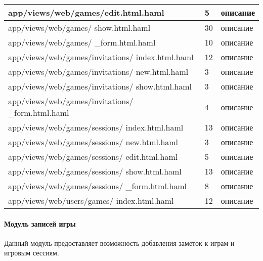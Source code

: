\begin{longtable}[h]{| p{} | p{} | p{} |}
  \hline
  app/views/web/games/edit.html.haml   &   5  &  описание \\
  \hline
  app/views/web/games/ show.html.haml   &   30  &  описание \\
  \hline
  app/views/web/games/ \_form.html.haml   &   10  &  описание \\
  \hline
  app/views/web/games/invitations/ index.html.haml   &   12  &  описание \\
  \hline
  app/views/web/games/invitations/ new.html.haml   &   3  &  описание \\
  \hline
  app/views/web/games/invitations/ show.html.haml   &   3  &  описание \\
  \hline
  app/views/web/games/invitations/ \_form.html.haml   &   4  &  описание \\
  \hline
  app/views/web/games/sessions/ index.html.haml   &   13  &  описание \\
  \hline
  app/views/web/games/sessions/ new.html.haml   &   3  &  описание \\
  \hline
  app/views/web/games/sessions/ edit.html.haml   &   5  &  описание \\
  \hline
  app/views/web/games/sessions/ show.html.haml   &   13  &  описание \\
  \hline
  app/views/web/games/sessions/ \_form.html.haml   &   8  &  описание \\
  \hline
  app/views/web/users/games/ index.html.haml   &   12  &  описание \\
  \hline
\end{longtable}


\paragraph{Модуль записей игры}

Данный модуль предоставляет возможность добавления заметок к играм и игровым сессиям.

